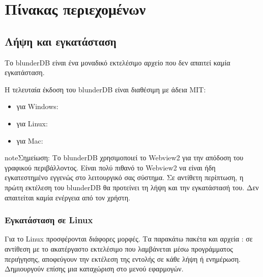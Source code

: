 \documentclass[letterpaper,10pt,greek]{sphinxmanual}
\begin{document}
\chapter{Πίνακας περιεχομένων}
\label{\detokenize{index:sommaire}}
\sphinxstepscope


\section{Λήψη και εγκατάσταση}
\label{\detokenize{telecharge_install:telechargement-et-installation}}\label{\detokenize{telecharge_install:telecharge-install}}\label{\detokenize{telecharge_install::doc}}
\sphinxAtStartPar
Το blunderDB είναι ένα μοναδικό εκτελέσιμο αρχείο που δεν απαιτεί καμία εγκατάσταση.

\sphinxAtStartPar
Η τελευταία έκδοση του blunderDB είναι διαθέσιμη με άδεια MIT:
\begin{itemize}
\item {} 
\sphinxAtStartPar
για Windows: 

\item {} 
\sphinxAtStartPar
για Linux: 

\item {} 
\sphinxAtStartPar
για Mac: 

\end{itemize}

\begin{sphinxadmonition}{note}{Σημείωση:}
\sphinxAtStartPar
Το blunderDB χρησιμοποιεί το Webview2 για την απόδοση του γραφικού περιβάλλοντος. Είναι πολύ πιθανό το Webview2 να είναι ήδη εγκατεστημένο εγγενώς στο λειτουργικό σας σύστημα. Σε αντίθετη περίπτωση, η πρώτη εκτέλεση του blunderDB θα προτείνει τη λήψη και την εγκατάστασή του. Δεν απαιτείται καμία ενέργεια από τον χρήστη.
\end{sphinxadmonition}


\subsection{Εγκατάσταση σε Linux}
\label{\detokenize{telecharge_install:installation-sous-linux}}
\sphinxAtStartPar
Για το Linux προσφέρονται διάφορες μορφές. Τα παρακάτω πακέτα και αρχεία : σε αντίθεση με το ακατέργαστο εκτελέσιμο που λαμβάνεται μέσω προγράμματος περιήγησης, αποφεύγουν την εκτέλεση της εντολής  σε κάθε λήψη ή ενημέρωση. Δημιουργούν επίσης μια καταχώριση στο μενού εφαρμογών.
\end{document}
